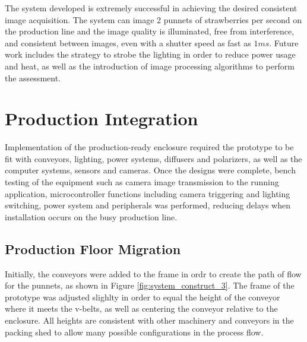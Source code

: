 \documentclass[fleqn,twoside]{article}
\begin{document}
The system developed is extremely successful in achieving the desired consistent image acquisition. The system can image 2 punnets of strawberries per second on the production line and the image quality is illuminated, free from interference, and consistent between images, even with a shutter speed as fast as $1ms$. Future work includes the strategy to strobe the lighting in order to reduce power usage and heat, as well as the introduction of image processing algorithms to perform the assessment.




\newpage

\section{Production Integration}
\label{sec:II}


Implementation of the production-ready enclosure required the prototype to be fit with conveyors, lighting, power systems, diffusers and polarizers, as well as the computer systems, sensors and cameras. Once the designs were complete, bench testing of the equipment such as camera image transmission to the running application, microcontroller functions including camera triggering and lighting switching, power system and peripherals was performed, reducing delays when installation occurs on the busy production line.





\subsection{Production Floor Migration }


Initially, the conveyors were added to the frame in ordr to create the path of flow for the punnets, as shown in Figure \ref{fig:system_construct_3}. The frame of the prototype was adjusted slighlty in order to equal the height of the conveyor where it meets the v-belts, as well as centering the conveyor relative to the enclosure. All heights are consistent with other machinery and conveyors in the packing shed to allow many possible configurations in the process flow. 
\end{document}
